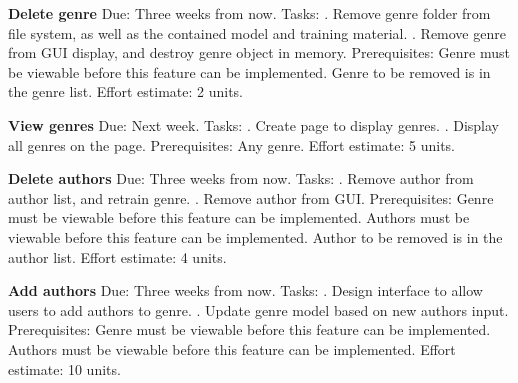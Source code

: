 \documentclass[12pt]{article}
\begin{document}
\textbf{Delete genre}\newline
Due: Three weeks from now.
\newline
Tasks:
. Remove genre folder from file system, as well as the contained model and training material.
. Remove genre from GUI display, and destroy genre object in memory.
\newline
Prerequisites: 
\newline
Genre must be viewable before this feature can be implemented.
\newline
Genre to be removed is in the genre list.
\newline
Effort estimate: 2 units.

\textbf{View genres}\newline
Due: Next week.
\newline
Tasks: 
. Create page to display genres.
. Display all genres on the page.
\newline
Prerequisites: Any genre.
\newline
Effort estimate: 5 units.

\textbf{Delete authors}\newline
Due: Three weeks from now.
\newline
Tasks: 
. Remove author from author list, and retrain genre. 
. Remove author from GUI.
\newline
Prerequisites: 
\newline
Genre must be viewable before this feature can be implemented.
\newline
Authors must be viewable before this feature can be implemented.
\newline
Author to be removed is in the author list.
\newline
Effort estimate: 4 units.

\textbf{Add authors}\newline
Due: Three weeks from now.
\newline
Tasks: 
. Design interface to allow users to add authors to genre.
. Update genre model based on new authors input.
\newline
Prerequisites:
\newline
Genre must be viewable before this feature can be implemented.
\newline
Authors must be viewable before this feature can be implemented.
\newline
Effort estimate: 10 units. 
\end{document}

